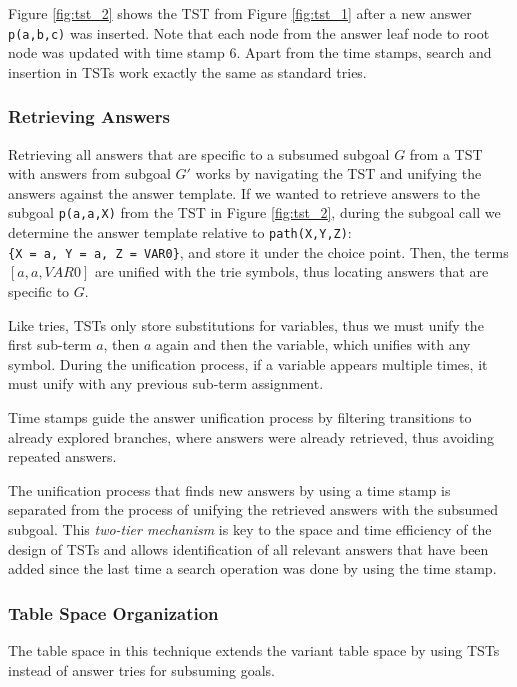 Figure \ref{fig:tst_2} shows the TST from Figure \ref{fig:tst_1} after a new answer \texttt{p(a,b,c)} was inserted.
Note that each node from the answer leaf node to root node was updated with time stamp 6. Apart from
the time stamps, search and insertion in TSTs work exactly the same as standard tries.

\subsubsection{Retrieving Answers}

Retrieving all answers that are specific to a subsumed subgoal $G$ from a TST with answers from subgoal $G'$
works by navigating the TST and unifying the answers against the answer template.
If we wanted to retrieve answers to the subgoal \texttt{p(a,a,X)} from the TST in Figure \ref{fig:tst_2},
during the subgoal call we determine the answer template relative to \texttt{path(X,Y,Z)}:
\texttt{\{X~=~a,~Y~=~a,~Z~=~VAR0\}},
and store it under the choice point. Then, the terms $[a, a, VAR0]$ are unified
with the trie symbols, thus locating answers that are specific to $G$.

Like tries, TSTs only store substitutions for variables, thus we must unify
the first sub-term $a$, then $a$ again and then the variable, which unifies with any symbol.
During the unification process, if a variable appears multiple times, it must unify with
any previous sub-term assignment.

Time stamps guide the answer unification process by filtering transitions to already explored branches, where
answers were already retrieved, thus avoiding repeated answers.

The unification process that finds new answers by using a time stamp is separated from the process
of unifying the retrieved answers with the subsumed subgoal. This \textit{two-tier mechanism} is key to the space and time
efficiency of the design of TSTs \cite{Johnson-99} and allows identification of all relevant answers that have
been added since the last time a search operation was done by using the time stamp.

\subsubsection{Table Space Organization}

The table space in this technique extends the variant table space by
using TSTs instead of answer tries for subsuming goals.
 

